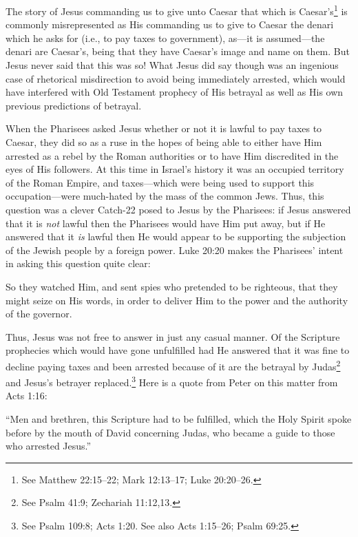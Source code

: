 \documentclass[letterpaper,12pt]{article}
\newenvironment{squote}
  {\small\quote}
  {\endquote\normalsize}
\begin{document}
The story of Jesus commanding us to give unto Caesar that which is Caesar's\footnote{See Matthew 22:15--22; Mark 12:13--17; Luke 20:20--26.} is commonly misrepresented as His commanding us to give to Caesar the denari which he asks for (i.e., to pay taxes to government), as---it is assumed---the denari are Caesar's, being that they have Caesar's image and name on them. But Jesus never said that this was so! What Jesus did say though was an ingenious case of rhetorical misdirection to avoid being immediately arrested, which would have interfered with Old Testament prophecy of His betrayal as well as His own previous predictions of betrayal.

When the Pharisees asked Jesus whether or not it is lawful to pay taxes to Caesar, they did so as a ruse in the hopes of being able to either have Him arrested as a rebel by the Roman authorities or to have Him discredited in the eyes of His followers. At this time in Israel's history it was an occupied territory of the Roman Empire, and taxes---which were being used to support this occupation---were much-hated by the mass of the common Jews. Thus, this question was a clever Catch-22 posed to Jesus by the Pharisees: if Jesus answered that it is \emph{not} lawful then the Pharisees would have Him put away, but if He answered that it \emph{is} lawful then He would appear to be supporting the subjection of the Jewish people by a foreign power. Luke 20:20 makes the Pharisees' intent in asking this question quite clear:

\begin{squote}
So they watched Him, and sent spies who pretended to be righteous, that they might seize on His words, in order to deliver Him to the power and the authority of the governor.
\end{squote}

Thus, Jesus was not free to answer in just any casual manner. Of the Scripture prophecies which would have gone unfulfilled had He answered that it was fine to decline paying taxes and been arrested because of it are the betrayal by Judas\footnote{See Psalm 41:9; Zechariah 11:12,13.} and Jesus's betrayer replaced.\footnote{See Psalm 109:8; Acts 1:20. See also Acts 1:15--26; Psalm 69:25.} Here is a quote from Peter on this matter from Acts 1:16:

\begin{squote}
``Men and brethren, this Scripture had to be fulfilled, which the Holy Spirit spoke before by the mouth of David concerning Judas, who became a guide to those who arrested Jesus.''
\end{squote}
\end{document}
